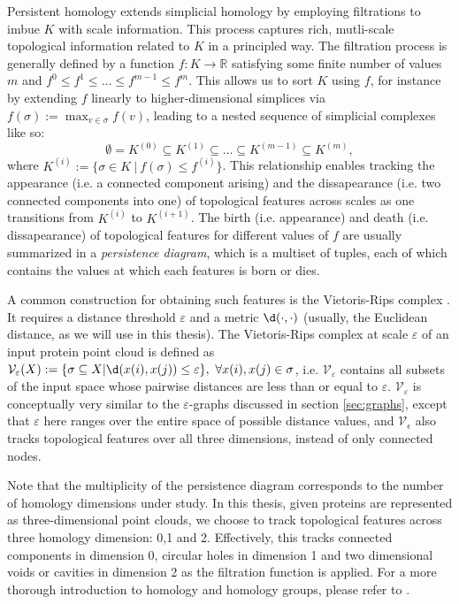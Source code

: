 Persistent homology extends simplicial homology by employing filtrations to
imbue $K$ with scale information. This process captures rich, mutli-scale
topological information related to $K$ in a principled way. The filtration
process is generally defined by a function $f: K\to\mathbb{R}$ satisfying some
finite number of values $m$ and $f^{0}\leq f^{1}\leq\dots\leq f^{m-1}\leq
f^{m}$. This allows us to sort $K$ using $f$, for instance by extending $f$
linearly to higher-dimensional simplices via $f(\sigma):=\max_{v\in\sigma}f(v)$,
leading to a nested sequence of simplicial complexes like so:
\begin{equation}
  \label{eq:nested_simplicial_complexes}
  \emptyset=K^{(0)}\subseteq K^{(1)}\subseteq \dots\subseteq K^{(m-1)}\subseteq K^{(m)},
\end{equation}
where $K^{(i)}:=\{\sigma\in K\ |\ f(\sigma)\leq f^{(i)}\}$. This relationship
enables tracking the appearance (i.e. a connected component arising) and the
dissapearance (i.e. two connected components into one) of topological features
across scales as one transitions from $K^{(i)}$ to $K^{(i+1)}$. The birth (i.e.
appearance) and death (i.e. dissapearance) of topological features for different
values of $f$ are usually summarized in a \emph{persistence diagram}, which is a
multiset of tuples, each of which contains the values at which each features is
born or dies.

A common construction for obtaining such features is the Vietoris-Rips complex
\citep{vietoris1927hoheren}. It requires a distance threshold $\varepsilon$ and
a metric $\d( \cdot, \cdot)$ (usually, the Euclidean distance, as we will
use in this thesis). The Vietoris-Rips complex at scale $\varepsilon$ of an
input protein point cloud is defined as
$\mathcal{V}_{\varepsilon}(X):=\{\sigma\subseteq X| \d(x(i),
x(j))\leq\varepsilon\},\ \forall x(i),x(j)\in\sigma$, i.e.
$\mathcal{V}_{\varepsilon}$ contains all subsets of the input space whose
pairwise distances are less than or equal to $\varepsilon$.
$\mathcal{V}_{\varepsilon}$ is conceptually very similar to the
$\varepsilon$-graphs discussed in section \ref{sec:graphs}, except that
$\varepsilon$ here ranges over the entire space of possible distance values, and
$\mathcal{V}_{\epsilon}$ also tracks topological features over all three
dimensions, instead of only connected nodes.

Note that the multiplicity of the persistence diagram corresponds to the number
of homology dimensions under study. In this thesis, given proteins are
represented as three-dimensional point clouds, we choose to track topological
features across three homology dimension: 0,1 and 2. Effectively, this tracks
connected components in dimension 0, circular holes in dimension 1 and two
dimensional voids or cavities in dimension 2 as the filtration function is
applied. For a more thorough introduction to homology and homology groups,
please refer to \cite{edelsbrunner2010computational}.

